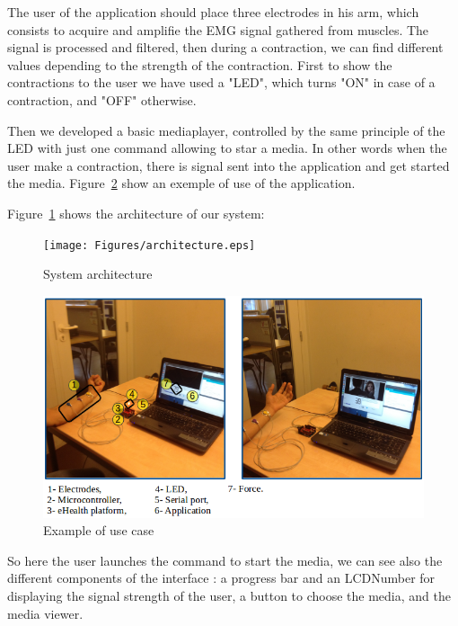 \documentclass[conference]{IEEEtran}
\begin{document}
The user of the application should place three electrodes in his arm, which consists to acquire and amplifie the EMG signal gathered from muscles. 
The signal is processed and filtered, then during a contraction, we can find different values depending to the strength of the contraction. 
First to show the contractions to the user we have used a "LED", which turns "ON" in case of a contraction, and "OFF" otherwise.\par
Then we developed a basic mediaplayer, controlled by the same principle of the LED with just one command allowing to star a media. In other words
when the user make a contraction, there is signal sent into the application and get started the media.
Figure~\ref{fig:example} show an exemple of use of the application. \par
\par
Figure~\ref{fig:architecture} shows the architecture of our system:

\begin{figure}[!hb]
    \texttt{[image: Figures/architecture.eps]}
    \caption{System architecture}
    \label{fig:architecture}
\end{figure}
 
\begin{figure}[!hb]
    \includegraphics[scale=0.30]{Figures/app2.png}
    \caption{Example of use case}
    \label{fig:example}
\end{figure}
So here the user launches the command to start the media, 
we can see also the different components of the interface : a progress bar and an LCDNumber for displaying the signal strength of the user, 
a button to choose the media, and the media viewer.\par
\end{document}
